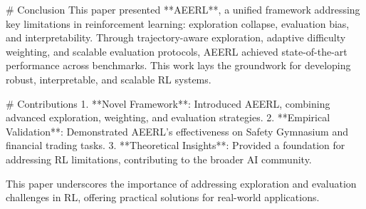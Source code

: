 # Conclusion  
This paper presented **AEERL**, a unified framework addressing key limitations in reinforcement learning: exploration collapse, evaluation bias, and interpretability. Through trajectory-aware exploration, adaptive difficulty weighting, and scalable evaluation protocols, AEERL achieved state-of-the-art performance across benchmarks. This work lays the groundwork for developing robust, interpretable, and scalable RL systems.  

# Contributions  
1. **Novel Framework**: Introduced AEERL, combining advanced exploration, weighting, and evaluation strategies.  
2. **Empirical Validation**: Demonstrated AEERL's effectiveness on Safety Gymnasium and financial trading tasks.  
3. **Theoretical Insights**: Provided a foundation for addressing RL limitations, contributing to the broader AI community.  

This paper underscores the importance of addressing exploration and evaluation challenges in RL, offering practical solutions for real-world applications.